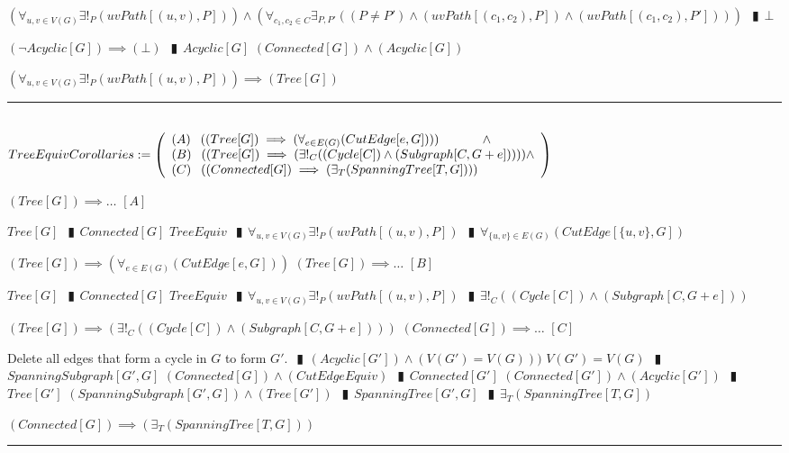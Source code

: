 \documentclass{book}
\newcommand{\abr}{:=}
\newcommand{\pipe}{$\phantom{(}\vrectangleblack\phantom{)}$}
\newcommand{\utup}[1]{\{#1\}}
\begin{document}
\begin{enumerate}
\begin{enumerate}
\begin{enumerate}
      \lit $(\forall_{u, v \in V(G)} \exists!_{P}(uvPath[(u, v), P])) \land (\forall_{c_1, c_2 \in C} \exists_{P, P'}((P \neq P') \land (uvPath[(c_1, c_2), P]) \land (uvPath[(c_1, c_2), P'])))$ \pipe $\bot$
    \end{enumerate}
    \lit $(\lnot Acyclic[G]) \implies (\bot)$ \pipe $Acyclic[G]$
    \lit $(Connected[G]) \land (Acyclic[G])$
  \end{enumerate}
  \lit $(\forall_{u, v \in V(G)} \exists!_{P}(uvPath[(u, v), P])) \implies (Tree[G])$
\end{enumerate} \vspace{.75mm} \hrule \vspace{.75mm} \ \\ 

$TreeEquivCorollaries \abr
\left(\begin{array}{ll}
  (A) \phantom{-} ((Tree[G]) \implies (\forall_{e \in E(G)}(CutEdge[e, G]))) \hfill \land \hfill \\
  (B) \phantom{-} ((Tree[G]) \implies (\exists!_{C}((Cycle[C]) \land (Subgraph[C, G + e])))) \hfill \land \hfill \\
  (C) \phantom{-} ((Connected[G]) \implies (\exists_{T}(SpanningTree[T, G])))
\end{array}\right)$
\begin{enumerate}
  \lit $(Tree[G]) \implies \ldots$    $[A]$
  \begin{enumerate}
    \lit $Tree[G]$ \pipe $Connected[G]$
    \lit $TreeEquiv$ \pipe $\forall_{u, v \in V(G)} \exists!_{P}(uvPath[(u, v), P])$ \pipe $\forall_{\utup{u, v} \in E(G)}(CutEdge[\utup{u, v}, G])$
  \end{enumerate}
  \lit $(Tree[G]) \implies (\forall_{e \in E(G)}(CutEdge[e, G]))$
  \lit $(Tree[G]) \implies \ldots$    $[B]$
  \begin{enumerate}
    \lit $Tree[G]$ \pipe $Connected[G]$
    \lit $TreeEquiv$ \pipe $\forall_{u, v \in V(G)} \exists!_{P}(uvPath[(u, v), P])$ \pipe $\exists!_{C}((Cycle[C]) \land (Subgraph[C, G + e]))$
  \end{enumerate}
  \lit $(Tree[G]) \implies (\exists!_{C}((Cycle[C]) \land (Subgraph[C, G + e])))$
  \lit $(Connected[G]) \implies \ldots$    $[C]$
  \begin{enumerate}
    \lit Delete all edges that form a cycle in $G$ to form $G'$. \pipe $(Acyclic[G']) \land (V(G') = V(G)))$
    \lit $V(G') = V(G)$ \pipe $SpanningSubgraph[G', G]$
    \lit $(Connected[G]) \land (CutEdgeEquiv)$ \pipe $Connected[G']$
    \lit $(Connected[G']) \land (Acyclic[G'])$ \pipe $Tree[G']$
    \lit $(SpanningSubgraph[G', G]) \land (Tree[G'])$ \pipe $SpanningTree[G', G]$ \pipe $\exists_{T}(SpanningTree[T, G])$
  \end{enumerate}
  \lit $(Connected[G]) \implies (\exists_{T}(SpanningTree[T, G]))$
\end{enumerate} \vspace{.75mm} \hrule \vspace{.75mm} \ \\ 
\end{document}
